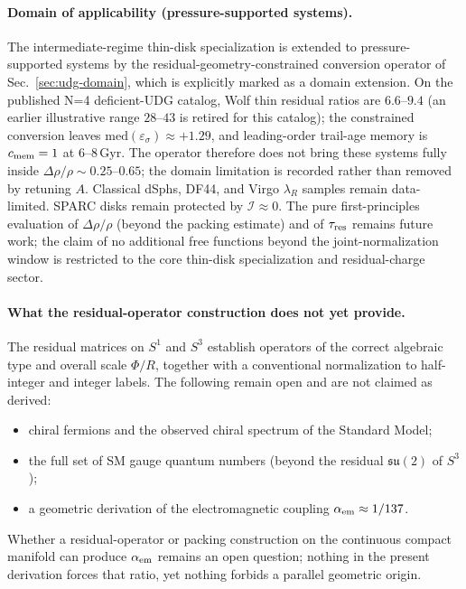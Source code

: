 \documentclass[11pt,a4paper]{article}
\begin{document}
\paragraph{Domain of applicability (pressure-supported systems).}
The intermediate-regime thin-disk specialization is extended to pressure-supported systems by the residual-geometry-constrained conversion operator of Sec.~\ref{sec:udg-domain}, which is explicitly marked as a domain extension. On the published N=4 deficient-UDG catalog, Wolf thin residual ratios are \(6.6\)--\(9.4\) (an earlier illustrative range \(28\)--\(43\) is retired for this catalog); the constrained conversion leaves \(\mathrm{med}(\varepsilon_\sigma)\approx +1.29\), and leading-order trail-age memory is \(c_{\rm mem}=1\) at \(6\)--\(8\,\mathrm{Gyr}\). The operator therefore does not bring these systems fully inside \(\Delta\rho/\rho\sim0.25\)--\(0.65\); the domain limitation is recorded rather than removed by retuning \(A\). Classical dSphs, DF44, and Virgo \(\lambda_R\) samples remain data-limited. SPARC disks remain protected by \(\mathcal{I}\approx0\). The pure first-principles evaluation of \(\Delta\rho/\rho\) (beyond the packing estimate) and of \(\tau_{\rm res}\) remains future work; the claim of no additional free functions beyond the joint-normalization window is restricted to the core thin-disk specialization and residual-charge sector.

\paragraph{What the residual-operator construction does not yet provide.}
The residual matrices on \(S^1\) and \(S^3\) establish operators of the correct algebraic type and overall scale \(\Phi/R\), together with a conventional normalization to half-integer and integer labels. The following remain open and are not claimed as derived:
\begin{itemize}[leftmargin=*]
\item chiral fermions and the observed chiral spectrum of the Standard Model;
\item the full set of SM gauge quantum numbers (beyond the residual \(\mathfrak{su}(2)\) of \(S^3\));
\item a geometric derivation of the electromagnetic coupling \(\alpha_{\rm em}\approx 1/137\).
\end{itemize}
Whether a residual-operator or packing construction on the continuous compact manifold can produce \(\alpha_{\rm em}\) remains an open question; nothing in the present derivation forces that ratio, yet nothing forbids a parallel geometric origin.
\end{document}
